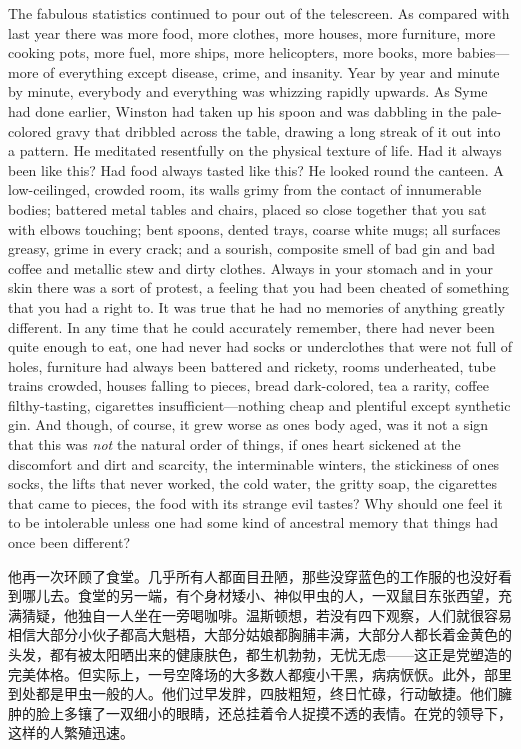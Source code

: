 \begin{paracol}{2}
The fabulous statistics continued to pour out of the telescreen. As
compared with last year there was more food, more clothes, more houses,
more furniture, more cooking pots, more fuel, more ships, more
helicopters, more books, more babies---more of everything except
disease, crime, and insanity. Year by year and minute by minute,
everybody and everything was whizzing rapidly upwards. As Syme had done
earlier, Winston had taken up his spoon and was dabbling in the
pale-colored gravy that dribbled across the table, drawing a long streak
of it out into a pattern. He meditated resentfully on the physical
texture of life. Had it always been like this? Had food always tasted
like this? He looked round the canteen. A low-ceilinged, crowded room,
its walls grimy from the contact of innumerable bodies; battered metal
tables and chairs, placed so close together that you sat with elbows
touching; bent spoons, dented trays, coarse white mugs; all surfaces
greasy, grime in every crack; and a sourish, composite smell of bad gin
and bad coffee and metallic stew and dirty clothes. Always in your
stomach and in your skin there was a sort of protest, a feeling that you
had been cheated of something that you had a right to. It was true that
he had no memories of anything greatly different. In any time that he
could accurately remember, there had never been quite enough to eat, one
had never had socks or underclothes that were not full of holes,
furniture had always been battered and rickety, rooms underheated, tube
trains crowded, houses falling to pieces, bread dark-colored, tea a
rarity, coffee filthy-tasting, cigarettes insufficient---nothing cheap
and plentiful except synthetic gin. And though, of course, it grew worse
as one\textquotesingle s body aged, was it not a sign that this was
\emph{not} the natural order of things, if one\textquotesingle s heart
sickened at the discomfort and dirt and scarcity, the interminable
winters, the stickiness of one\textquotesingle s socks, the lifts that
never worked, the cold water, the gritty soap, the cigarettes that came
to pieces, the food with its strange evil tastes? Why should one feel it
to be intolerable unless one had some kind of ancestral memory that
things had once been different?

\switchcolumn

他再一次环顾了食堂。几乎所有人都面目丑陋，那些没穿蓝色的工作服的也没好看到哪儿去。食堂的另一端，有个身材矮小、神似甲虫的人，一双鼠目东张西望，充满猜疑，他独自一人坐在一旁喝咖啡。温斯顿想，若没有四下观察，人们就很容易相信大部分小伙子都高大魁梧，大部分姑娘都胸脯丰满，大部分人都长着金黄色的头发，都有被太阳晒出来的健康肤色，都生机勃勃，无忧无虑——这正是党塑造的完美体格。但实际上，一号空降场的大多数人都瘦小干黑，病病恹恹。此外，部里到处都是甲虫一般的人。他们过早发胖，四肢粗短，终日忙碌，行动敏捷。他们臃肿的脸上多镶了一双细小的眼睛，还总挂着令人捉摸不透的表情。在党的领导下，这样的人繁殖迅速。


\end{paracol}
